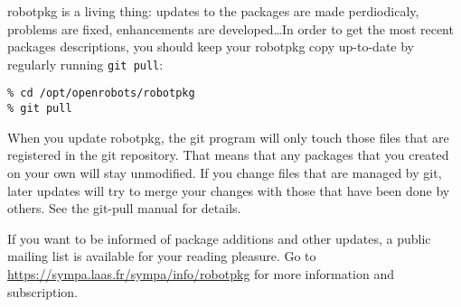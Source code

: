robotpkg is  a living  thing: updates  to the packages  are made  perdiodicaly,
problems are fixed,  enhancements are developed\ldots  In order to get the most
recent packages descriptions, you should keep your robotpkg copy up-to-date by
regularly running {\tt git pull}:

\begin{verbatim}
% cd /opt/openrobots/robotpkg
% git pull
\end{verbatim}

When you update robotpkg, the git program will only  touch those files that are
registered in the git repository. That means that any packages that you created
on your own will stay unmodified. If you change files that  are managed by git,
later updates will try to merge your changes with  those that have been done by
others. See the git-pull manual for details.

If you want  to be informed  of package additions  and other  updates, a public
mailing    list  is   available    for   your    reading   pleasure.  Go     to
\url{https://sympa.laas.fr/sympa/info/robotpkg}    for   more  information  and
subscription.
